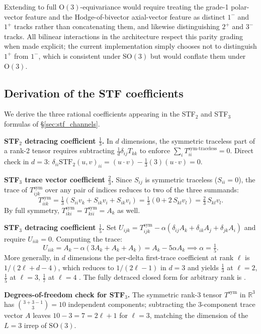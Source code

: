 Extending to full $\mathrm{O}(3)$-equivariance would require treating the grade-1 polar-vector feature and the Hodge-of-bivector axial-vector feature as distinct $1^-$ and $1^+$ tracks rather than concatenating them, and likewise distinguishing $2^+$ and $3^-$ tracks. All bilinear interactions in the architecture respect this parity grading when made explicit; the current implementation simply chooses not to distinguish $1^+$ from $1^-$, which is consistent under $\mathrm{SO}(3)$ but would conflate them under $\mathrm{O}(3)$.

\subsection{Derivation of the STF coefficients}\label{supp:stf_coefficients}

We derive the three rational coefficients appearing in the STF$_2$ and STF$_3$ formulas of \S\ref{sec:stf_channels}.

\textbf{STF$_2$ detracing coefficient $\tfrac{1}{3}$.} In $d$ dimensions, the symmetric traceless part of a rank-2 tensor requires subtracting $\tfrac{1}{d} \delta_{ij} T_{kk}$ to enforce $\sum_i T_{ii}^{\text{sym-traceless}} = 0$. Direct check in $d=3$: $\delta_{ii} \mathrm{STF}_2(u,v)_{ii} = (u\cdot v) - \tfrac{1}{3}(3)(u\cdot v) = 0$.

\textbf{STF$_3$ trace vector coefficient $\tfrac{2}{3}$.} Since $S_{ij}$ is symmetric traceless ($S_{ii}=0$), the trace of $T^{\text{sym}}_{ijk}$ over any pair of indices reduces to two of the three summands:
\[
T^{\text{sym}}_{iik} = \tfrac{1}{3}(S_{ii}v_k + S_{ik}v_i + S_{ik}v_i) = \tfrac{1}{3}(0 + 2\,S_{kl}v_l) = \tfrac{2}{3}\,S_{kl}v_l.
\]
By full symmetry, $T^{\text{sym}}_{iki} = T^{\text{sym}}_{kii} = A_k$ as well.

\textbf{STF$_3$ detracing coefficient $\tfrac{1}{5}$.} Set $U_{ijk} = T^{\text{sym}}_{ijk} - \alpha(\delta_{ij}A_k + \delta_{ik}A_j + \delta_{jk}A_i)$ and require $U_{iik} = 0$. Computing the trace:
\[
U_{iik} = A_k - \alpha(3A_k + A_k + A_k) = A_k - 5\alpha A_k \implies \alpha = \tfrac{1}{5}.
\]
More generally, in $d$ dimensions the per-delta first-trace coefficient at rank $\ell$ is $1/(2\ell + d - 4)$, which reduces to $1/(2\ell - 1)$ in $d=3$ and yields $\tfrac{1}{3}$ at $\ell{=}2$, $\tfrac{1}{5}$ at $\ell{=}3$, $\tfrac{1}{7}$ at $\ell{=}4$ \citep{applequist1989traceless,thorne1980multipole}. The fully detraced closed form for arbitrary rank is \citet[Theorem~2]{applequist1989traceless}.

\textbf{Degrees-of-freedom check for STF$_3$.} The symmetric rank-3 tensor $T^{\text{sym}}$ in $\mathbb{R}^3$ has $\binom{3+3-1}{3} = 10$ independent components; subtracting the 3-component trace vector $A$ leaves $10 - 3 = 7 = 2\ell + 1$ for $\ell = 3$, matching the dimension of the $L{=}3$ irrep of $\mathrm{SO}(3)$.


